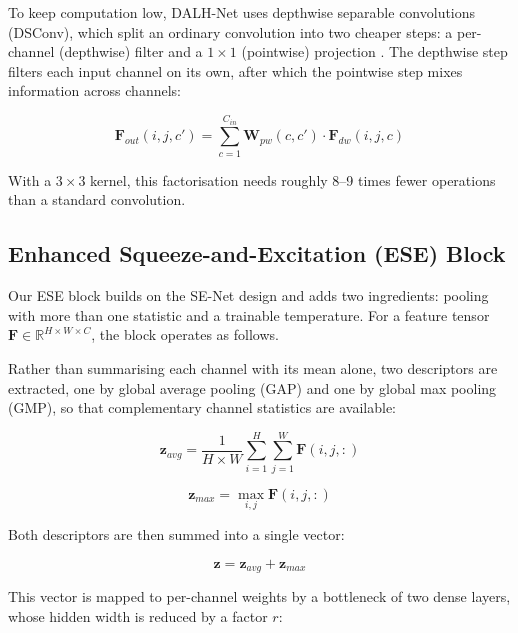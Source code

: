 \documentclass[default, iicol]{sn-jnl}
\theoremstyle{thmstyleone}%
\theoremstyle{thmstyletwo}%
\theoremstyle{thmstylethree}%
\begin{document}
To keep computation low, DALH-Net uses depthwise separable convolutions (DSConv), which split an ordinary convolution into two cheaper steps: a per-channel (depthwise) filter and a $1 \times 1$ (pointwise) projection \cite{chollet2017xception}. The depthwise step filters each input channel on its own, after which the pointwise step mixes information across channels:

\begin{equation}
\mathbf{F}_{out}(i,j,c') = \sum_{c=1}^{C_{in}} \mathbf{W}_{pw}(c,c') \cdot \mathbf{F}_{dw}(i,j,c)
\end{equation}

With a $3 \times 3$ kernel, this factorisation needs roughly 8--9 times fewer operations than a standard convolution.


\subsection{Enhanced Squeeze-and-Excitation (ESE) Block}

Our ESE block builds on the SE-Net design \cite{hu2018squeeze} and adds two ingredients: pooling with more than one statistic and a trainable temperature. For a feature tensor $\mathbf{F} \in \mathbb{R}^{H \times W \times C}$, the block operates as follows.

Rather than summarising each channel with its mean alone, two descriptors are extracted, one by global average pooling (GAP) and one by global max pooling (GMP), so that complementary channel statistics are available:

\begin{equation}
\mathbf{z}_{avg} = \frac{1}{H \times W} \sum_{i=1}^{H}\sum_{j=1}^{W} \mathbf{F}(i,j,:)
\label{eq:gap}
\end{equation}

\begin{equation}
\mathbf{z}_{max} = \max_{i,j} \mathbf{F}(i,j,:)
\label{eq:gmp}
\end{equation}

Both descriptors are then summed into a single vector:

\begin{equation}
\mathbf{z} = \mathbf{z}_{avg} + \mathbf{z}_{max}
\label{eq:combined_pool}
\end{equation}


This vector is mapped to per-channel weights by a bottleneck of two dense layers, whose hidden width is reduced by a factor $r$:
\end{document}
